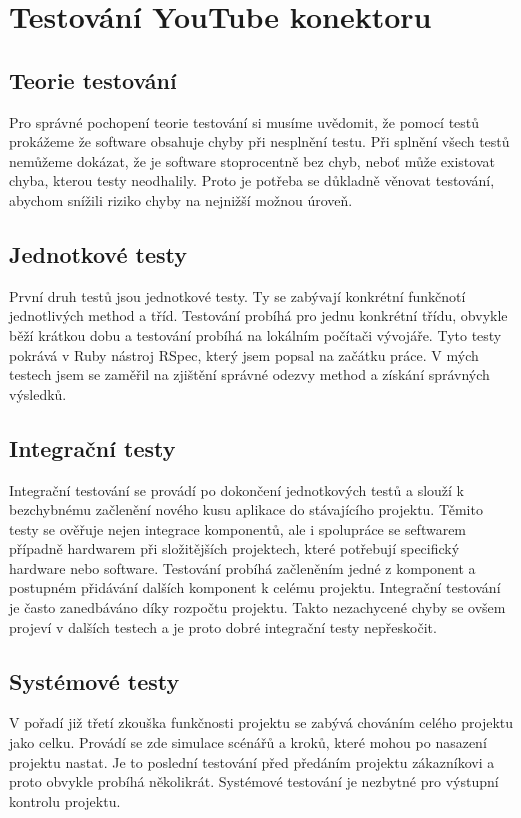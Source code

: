 \section{Testování YouTube konektoru}
\subsection{Teorie testování}
\par Pro správné pochopení teorie testování\cite{si1} si musíme uvědomit, že pomocí testů prokážeme že software obsahuje chyby při nesplnění testu. Při splnění všech testů nemůžeme dokázat, že je software stoprocentně bez chyb, neboť může existovat chyba, kterou testy neodhalily. Proto je potřeba se důkladně věnovat testování, abychom snížili riziko chyby na nejnižší možnou úroveň.
\subsection{Jednotkové testy}
\par První druh testů jsou jednotkové testy\cite{si1}. Ty se zabývají konkrétní funkčnotí jednotlivých method a tříd. Testování probíhá pro jednu konkrétní třídu, obvykle běží krátkou dobu a testování probíhá na lokálním počítači vývojáře. Tyto testy pokrává v Ruby nástroj RSpec, který jsem popsal na začátku práce. V mých testech jsem se zaměřil na zjištění správné odezvy method a získání správných výsledků. 
\subsection{Integrační testy}
\par Integrační testování\cite{si1} se provádí po dokončení jednotkových testů a slouží k bezchybnému začlenění nového kusu aplikace do stávajícího projektu. Těmito testy se ověřuje nejen integrace komponentů, ale i spolupráce se seftwarem případně hardwarem při složitějších projektech, které potřebují specifický hardware nebo software. Testování probíhá začleněním jedné z komponent a postupném přidávání dalších komponent k celému projektu. Integrační testování je často zanedbáváno díky rozpočtu projektu. Takto nezachycené chyby se ovšem projeví v dalších testech a je proto dobré integrační testy nepřeskočit.
\subsection{Systémové testy}
\par V pořadí již třetí zkouška funkčnosti projektu se zabývá chováním celého projektu jako celku. Provádí se zde simulace scénářů a kroků, které mohou po nasazení projektu nastat. Je to poslední testování před předáním projektu zákazníkovi a proto obvykle probíhá několikrát. Systémové testování\cite{si1} je nezbytné pro výstupní kontrolu projektu.
